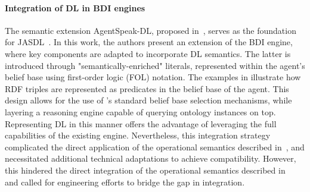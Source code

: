 \documentclass[
]{ceurart}
\begin{document}
\paragraph{Integration of DL in BDI engines}
The semantic extension AgentSpeak-DL, proposed in~\cite{DBLP:conf/dalt/MoreiraVBH05}, serves as the foundation for JASDL~\cite{DBLP:conf/dalt/KlapiscakB08}.
%
In this work, the authors present an extension of the \jason{} \ac{BDI} engine, where key components are adapted to incorporate \ac{DL} semantics.
%
The latter is introduced through "semantically-enriched" literals, represented within the agent's belief base using first-order logic (FOL) notation.
%
The examples in  illustrate how \ac{RDF} triples are represented as predicates in the belief base of the agent.
%
This design allows for the use of \jason{}'s standard belief base selection mechanisms, while layering a reasoning engine capable of querying ontology instances on top.
%
Representing \ac{DL} in this manner offers the advantage of leveraging the full capabilities of the existing \jason{} engine.
%
Nevertheless, this integration strategy complicated the direct application of the operational semantics described in~\cite{DBLP:conf/dalt/KlapiscakB08}, and necessitated additional technical adaptations to achieve compatibility.
%
However, 
this hindered the direct integration of the operational semantics described in~\cite{DBLP:conf/dalt/KlapiscakB08} 
and called for engineering efforts to bridge the gap in integration.


\end{document}
